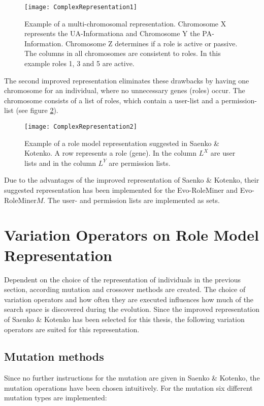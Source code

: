         \begin{figure}[H]
            \centering
            \texttt{[image: ComplexRepresentation1]}
            \caption{Example of a multi-chromosomal representation. Chromosome X represents the UA-Informationa and Chromosome Y the PA-Information. Chromosome Z determines if a role is active or passive. The columns in all chromosomes are consistent to roles. In this example roles 1, 3 and 5 are active.}
            \label{fig:representation2}
        \end{figure}
        
        The second improved representation eliminates these drawbacks by having one chromosome for an individual, where no unnecessary genes (roles) occur. The chromosome consists of a list of roles, which contain a user-list and a permission-list (see figure \ref{fig:representation3}).
        
        \begin{figure}[H]
            \centering
            \texttt{[image: ComplexRepresentation2]}
            \caption{Example of a role model representation suggested in Saenko \& Kotenko\cite{saenko2012design}. A row represents a role (gene). In the column $L^X$ are user lists and in the column $L^Y$ are permission lists.}
            \label{fig:representation3}
        \end{figure}
        
        Due to the advantages of the improved representation of Saenko \& Kotenko\cite{saenko2012design}, their suggested representation has been implemented for the Evo-RoleMiner and Evo-RoleMiner$M$. The user- and permission lists are implemented as sets.
    
    \section{Variation Operators on Role Model Representation}
    Dependent on the choice of the representation of individuals in the previous section, according mutation and crossover methods are created. The choice of variation operators and how often they are executed influences how much of the search space is discovered during the evolution. Since the improved representation of Saenko \& Kotenko\cite{saenko2012design} has been selected for this thesis, the following variation operators are suited for this representation.
    
        \subsection{Mutation methods}
        Since no further instructions for the mutation are given in Saenko \& Kotenko\cite{saenko2012design}, the mutation operations have been chosen intuitively. For the mutation six different mutation types are implemented:
        
